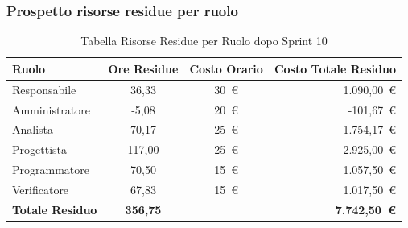 \subsubsection{Prospetto risorse residue per ruolo}
\begin{table}[H]
    \centering
    \renewcommand{\arraystretch}{1.3}
    \begin{tabularx}{\textwidth}{|X|c|c|r|}
        \hline
        \textbf{Ruolo} & \textbf{Ore Residue} & \textbf{Costo Orario} &
        \textbf{Costo Totale Residuo} \\
        \hline
        Responsabile   & 36,33 & 30~\euro & 1.090{,}00~\euro \\
        Amministratore & -5,08 & 20~\euro &   -101{,}67~\euro \\
        Analista       & 70,17 & 25~\euro & 1.754{,}17~\euro \\
        Progettista    & 117,00 & 25~\euro & 2.925{,}00~\euro \\
        Programmatore  & 70,50 & 15~\euro & 1.057{,}50~\euro \\
        Verificatore   & 67,83 & 15~\euro & 1.017{,}50~\euro \\
        \hline
        \textbf{Totale Residuo} & \textbf{356,75} & &
        \textbf{7.742{,}50~\euro} \\
        \hline
    \end{tabularx}
    \caption{Tabella Risorse Residue per Ruolo dopo Sprint 10}
\end{table}

